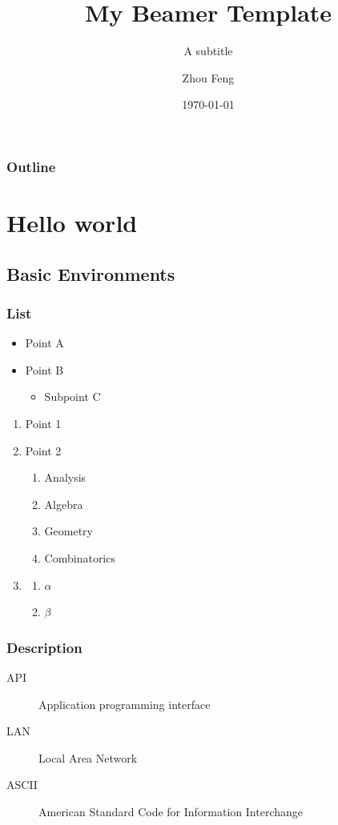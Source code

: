 \documentclass{beamer}
\title[Short Title]{My Beamer Template}
\subtitle{A subtitle}
\author[Z. Feng]{Zhou Feng}
\institute[]{The Chinese University of Hong Kong}
\date{\today}
\begin{document}
\begin{frame}[plain]
	\maketitle
\end{frame}

\begin{frame}\label{contents}
	\frametitle{Outline}
	\tableofcontents
\end{frame}



\section{Hello world}
\subsection{Basic Environments}
\begin{frame}
	\frametitle{List}
	\begin{itemize}
		\item Point A
		\item Point B \cite{Falconer2003}
		      \begin{itemize}
			      \item Subpoint C
		      \end{itemize}
	\end{itemize}

	\begin{enumerate}
		\item Point 1 \pause
		\item Point 2
		      \begin{enumerate}[I]
			      \item Analysis
			      \item Algebra
			      \item Geometry
			      \item Combinatorics
		      \end{enumerate}
		\item
		      \begin{enumerate}[i]
			      \item $ \alpha $
			      \item $ \beta $
		      \end{enumerate}
	\end{enumerate}

\end{frame}

\begin{frame}
	\frametitle{Description}
	\begin{description}
		\item[API] Application programming interface
		\item[LAN] Local Area Network
		\item[ASCII] American Standard Code for Information Interchange
	\end{description}
\end{frame}
\end{document}
